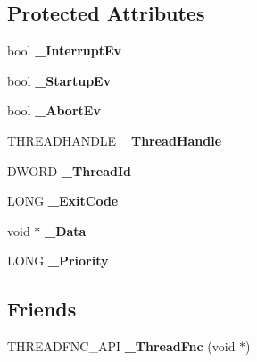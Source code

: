 \subsection*{Protected Attributes}
\begin{DoxyCompactItemize}
\item 
\mbox{\label{class_canberra_1_1_utility_1_1_core_1_1_thread_aecf8c6d58b0d2fdf8dbf6b5cc00544ef}} 
bool {\bfseries \+\_\+\+Interrupt\+Ev}
\item 
\mbox{\label{class_canberra_1_1_utility_1_1_core_1_1_thread_aaf372f08a8caa50fa737bf33c5576e71}} 
bool {\bfseries \+\_\+\+Startup\+Ev}
\item 
\mbox{\label{class_canberra_1_1_utility_1_1_core_1_1_thread_a180b5490025c84ee928d27438b2679ac}} 
bool {\bfseries \+\_\+\+Abort\+Ev}
\item 
\mbox{\label{class_canberra_1_1_utility_1_1_core_1_1_thread_a09d6b9dcfff99982905f582c1f34415d}} 
T\+H\+R\+E\+A\+D\+H\+A\+N\+D\+LE {\bfseries \+\_\+\+Thread\+Handle}
\item 
\mbox{\label{class_canberra_1_1_utility_1_1_core_1_1_thread_a845428e268a96dc738013c56bf5d3fd8}} 
D\+W\+O\+RD {\bfseries \+\_\+\+Thread\+Id}
\item 
\mbox{\label{class_canberra_1_1_utility_1_1_core_1_1_thread_abb0790ab8c9f634031611dfad2d3bfc0}} 
L\+O\+NG {\bfseries \+\_\+\+Exit\+Code}
\item 
\mbox{\label{class_canberra_1_1_utility_1_1_core_1_1_thread_acc7d7288c1bc16d5c017ba9a33eaa019}} 
void $\ast$ {\bfseries \+\_\+\+Data}
\item 
\mbox{\label{class_canberra_1_1_utility_1_1_core_1_1_thread_a6707096a3343dba5010ba1bcff7af080}} 
L\+O\+NG {\bfseries \+\_\+\+Priority}
\end{DoxyCompactItemize}
\subsection*{Friends}
\begin{DoxyCompactItemize}
\item 
\mbox{\label{class_canberra_1_1_utility_1_1_core_1_1_thread_a2000673d63812eba6993040ae399327f}} 
T\+H\+R\+E\+A\+D\+F\+N\+C\+\_\+\+A\+PI {\bfseries \+\_\+\+Thread\+Fnc} (void $\ast$)
\end{DoxyCompactItemize}
